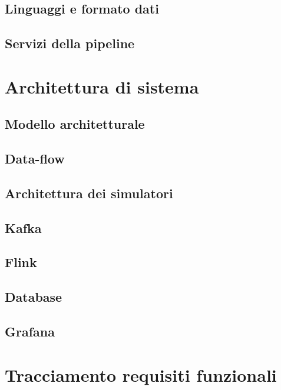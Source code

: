 \documentclass[8pt]{article}
\begin{document}
\subsection{Linguaggi e formato dati}
\subsection{Servizi della pipeline}
\section{Architettura di sistema}
\subsection{Modello architetturale}
\subsection{Data-flow}
\subsection{Architettura dei simulatori}
\subsection{Kafka}
\subsection{Flink}
\subsection{Database}
\subsection{Grafana}
\section{Tracciamento requisiti funzionali}
\end{document}
